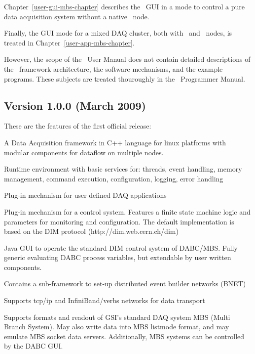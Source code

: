 Chapter~\ref{user-gui-mbs-chapter} describes the \dabc\ GUI 
in a mode to control a pure \mbs data acquisition system without 
a native \dabc\ node.

Finally, the GUI mode for a mixed DAQ cluster, both with \dabc\ and \mbs\ nodes, is
treated in Chapter~\ref{user-app-mbs-chapter}.

However, the scope of the \dabc\ User Manual does not contain 
detailed descriptions of the \dabc\ framework architecture, 
the software mechanisms, and the example programs. 
These subjects are treated thouroughly
in the \dabc\ Programmer Manual.


\subsection{Version 1.0.0 (March 2009)}
These are the features of the first official release:
\bnum
\item A Data Acquisition framework in C++ language for linux platforms
   with modular components for dataflow on multiple nodes.
   
\item Runtime environment with basic services for:
   threads, event handling, memory management, command execution, 
   configuration, logging, error handling

\item Plug-in mechanism for user defined DAQ applications

\item Plug-in mechanism for a control system. Features a finite state machine
   logic and parameters for monitoring and  configuration.
   The default implementation is based
   on the DIM protocol (http://dim.web.cern.ch/dim)

\item Java GUI to operate the standard DIM control system of DABC/MBS. 
   Fully generic evaluating DABC process variables, but extendable
   by user written components.

\item Contains a sub-framework to set-up distributed event builder networks (BNET) 
 
\item Supports tcp/ip and InfiniBand/verbs networks for data transport

\item Supports formats and readout of GSI's standard DAQ system MBS
   (Multi Branch System). May also write data into MBS listmode format,
   and may emulate MBS socket data servers.
   Additionally, MBS systems can be controlled by the DABC GUI.  
\enum

% 
% 
% 

